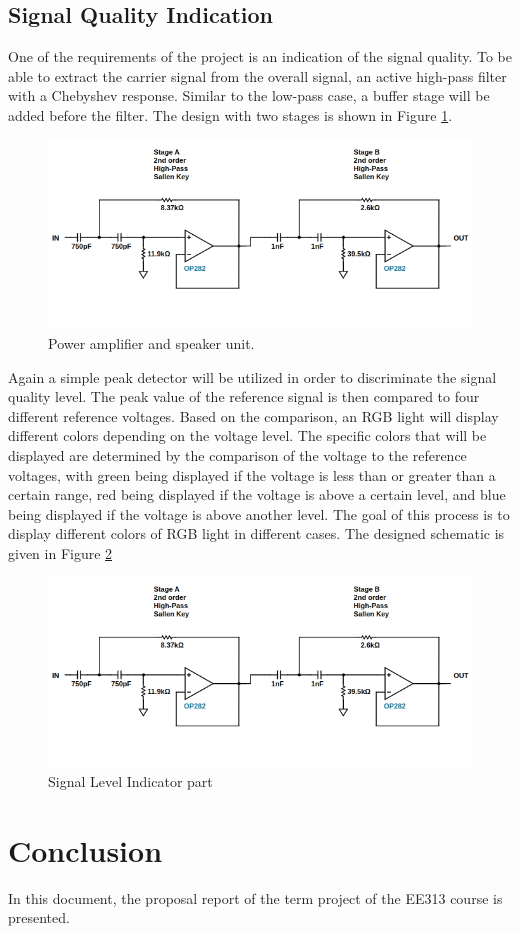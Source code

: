 \documentclass[a4paper,10pt]{IEEEtran}
\begin{document}
\subsection{Signal Quality Indication}
One of the requirements of the project is an indication of the signal quality. To be able to extract the carrier signal from the overall signal, an active high-pass filter with a Chebyshev response. Similar to the low-pass case, a buffer stage will be added before the filter. The design with two stages is shown in Figure \ref*{active_high}.
\begin{figure}[htbp!]
    \centering
    \includegraphics[width = 0.75\linewidth]{active_high_pass_circuit.png}
    \caption{Power amplifier and speaker unit.}
    \label{active_high}    
\end{figure} 

Again a simple peak detector will be utilized in order to discriminate the signal quality level. The peak value of the reference signal is then compared to four different reference voltages. Based on the comparison, an RGB light will display different colors depending on the voltage level. The specific colors that will be displayed are determined by the comparison of the voltage to the reference voltages, with green being displayed if the voltage is less than or greater than a certain range, red being displayed if the voltage is above a certain level, and blue being displayed if the voltage is above another level. The goal of this process is to display different colors of RGB light in different cases. The designed schematic is given in Figure \ref*{indicator}
\begin{figure}[htbp!]
    \centering
    \includegraphics[width = 0.75\linewidth]{active_high_pass_circuit.png}
    \caption{Signal Level Indicator part}
    \label{indicator}    
\end{figure} 
\vspace{-0.4cm}
\section{Conclusion}
In this document, the proposal report of the term project of the EE313 course is presented. 
\end{document}

